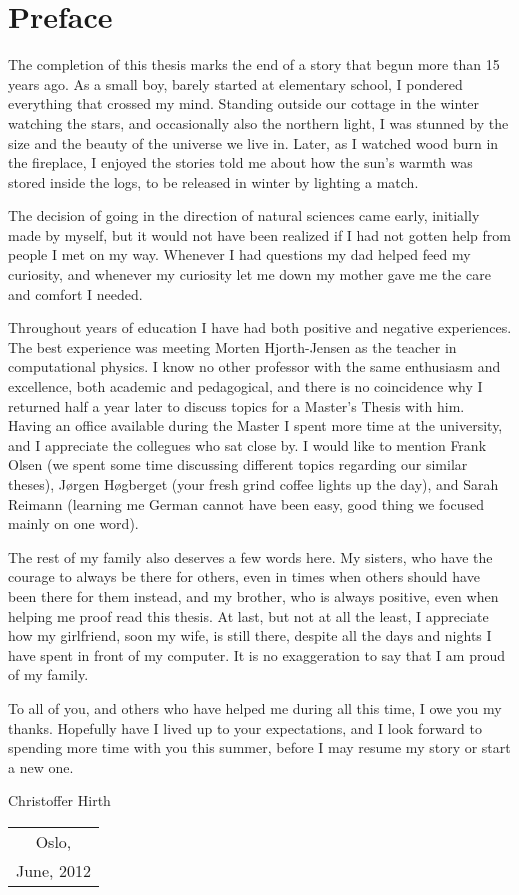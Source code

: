 \chapter*{Preface}
The completion of this thesis marks the end of a story that begun more than 15 years ago.
As a small boy, barely started at elementary school, I pondered everything that crossed my mind.
Standing outside our cottage in the winter watching the stars, and occasionally also the northern light, I was stunned by the size and the beauty of the universe we live in.
Later, as I watched wood burn in the fireplace, I enjoyed the stories told me about how the sun's warmth was stored inside the logs, to be released in winter by lighting a match.

 
The decision of going in the direction of natural sciences came early, initially made by myself, but it would not have been realized if I had not gotten help from people I met on my way.
Whenever I had questions my dad helped feed my curiosity, and whenever my curiosity let me down my mother gave me the care and comfort I needed.

 
Throughout years of education I have had both positive and negative experiences.
The best experience was meeting Morten Hjorth-Jensen as the teacher in computational physics.
I know no other professor with the same enthusiasm and excellence, both academic and pedagogical, and there is no coincidence why I returned half a year later to discuss topics for a Master's Thesis with him.
Having an office available during the Master I spent more time at the university, and I appreciate the collegues who sat close by.
I would like to mention Frank Olsen (we spent some time discussing different topics regarding our similar theses), Jørgen Høgberget (your fresh grind coffee lights up the day), and Sarah Reimann (learning me German cannot have been easy, good thing we focused mainly on one word).

 
The rest of my family also deserves a few words here. 
My sisters, who have the courage to always be there for others, even in times when others should have been there for them instead, and my brother, who is always positive, even when helping me proof read this thesis.
At last, but not at all the least, I appreciate how my girlfriend, soon my wife, is still there, despite all the days and nights I have spent in front of my computer.
It is no exaggeration to say that I am proud of my family.

 
To all of you, and others who have helped me during all this time, I owe you my thanks.
Hopefully have I lived up to your expectations, and I look forward to spending more time with you this summer, before I may resume my story or start a new one.




\begin{flushright}
Christoffer Hirth
\end{flushright}

\begin{tabular}{c}
Oslo,\\
June, 2012
\end{tabular}



